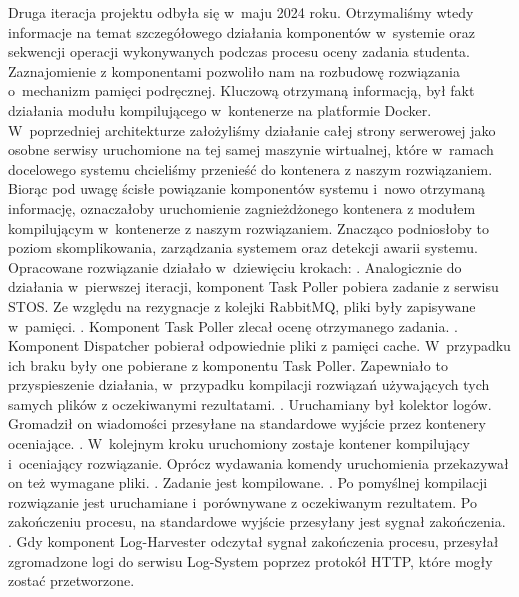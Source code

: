 \newline \indent Druga iteracja projektu odbyła się w~maju 2024 roku. Otrzymaliśmy wtedy informacje na temat szczegółowego działania komponentów w~systemie oraz sekwencji operacji wykonywanych podczas procesu oceny zadania studenta. Zaznajomienie z komponentami pozwoliło nam na rozbudowę rozwiązania o~mechanizm pamięci podręcznej. Kluczową otrzymaną informacją, był fakt działania modułu kompilującego w~kontenerze na platformie Docker. W~poprzedniej architekturze założyliśmy działanie całej strony serwerowej jako osobne serwisy uruchomione na tej samej maszynie wirtualnej, które w~ramach docelowego systemu chcieliśmy przenieść do kontenera z naszym rozwiązaniem. Biorąc pod uwagę ścisłe powiązanie komponentów systemu i~nowo otrzymaną informację, oznaczałoby uruchomienie zagnieżdżonego kontenera z modułem kompilującym w~kontenerze z naszym rozwiązaniem. Znacząco podniosłoby to poziom skomplikowania, zarządzania systemem oraz detekcji awarii systemu. Opracowane rozwiązanie działało w~dziewięciu krokach:
\newline {}. Analogicznie do działania w~pierwszej iteracji, komponent Task Poller pobiera zadanie z serwisu STOS. Ze względu na rezygnacje z kolejki RabbitMQ, pliki były zapisywane w~pamięci.
\newline {}. Komponent Task Poller zlecał ocenę otrzymanego zadania.
\newline {}. Komponent Dispatcher pobierał odpowiednie pliki z pamięci cache. W~przypadku ich braku były one pobierane z komponentu Task Poller. Zapewniało to przyspieszenie działania, w~przypadku kompilacji rozwiązań używających tych samych plików z oczekiwanymi rezultatami.
\newline {}. Uruchamiany był kolektor logów. Gromadził on wiadomości przesyłane na standardowe wyjście przez kontenery oceniające.
\newline {}. W~kolejnym kroku uruchomiony zostaje kontener kompilujący i~oceniający rozwiązanie. Oprócz wydawania komendy uruchomienia przekazywał on też wymagane pliki.
\newline {}. Zadanie jest kompilowane.
\newline {}. Po pomyślnej kompilacji rozwiązanie jest uruchamiane i~porównywane z oczekiwanym rezultatem. Po zakończeniu procesu, na standardowe wyjście przesyłany jest sygnał zakończenia.
\newline {}. Gdy komponent Log-Harvester odczytał sygnał zakończenia procesu, przesyłał zgromadzone logi do serwisu Log-System poprzez protokół HTTP, które mogły zostać przetworzone.
